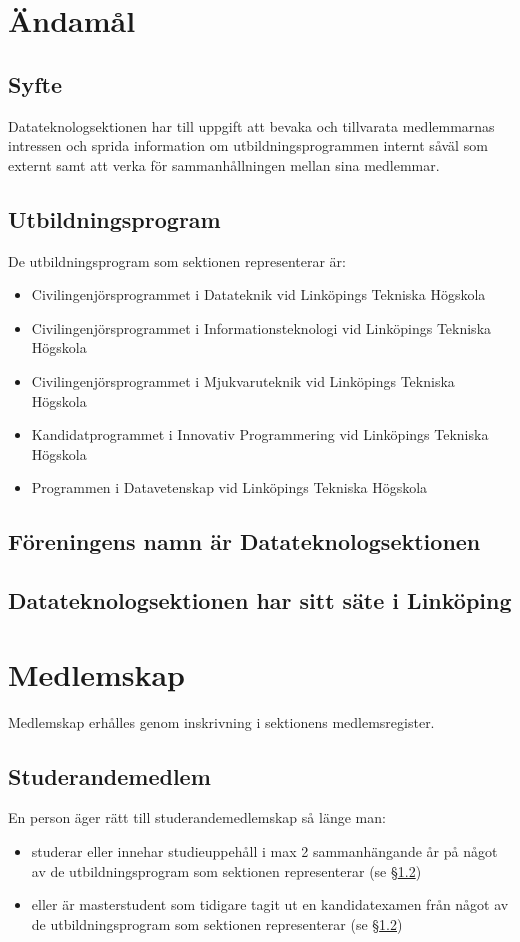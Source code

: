\documentclass{datateknologsektionen-document}
\begin{document}
\section{Ändamål}
\subsection{Syfte}
\label{syfte}
Datateknologsektionen har till uppgift att bevaka och tillvarata medlemmarnas intressen
och sprida information om utbildningsprogrammen internt såväl som externt samt att
verka för sammanhållningen mellan sina medlemmar.
\subsection{Utbildningsprogram}
\label{utbildningsprogram}
De utbildningsprogram som sektionen representerar är:
\begin{itemize}
  \item Civilingenjörsprogrammet i Datateknik vid Linköpings Tekniska Högskola
  \item Civilingenjörsprogrammet i Informationsteknologi vid Linköpings Tekniska Högskola
  \item Civilingenjörsprogrammet i Mjukvaruteknik vid Linköpings Tekniska Högskola
  \item Kandidatprogrammet i Innovativ Programmering vid Linköpings Tekniska Högskola
  \item Programmen i Datavetenskap vid Linköpings Tekniska Högskola
\end{itemize}

\subsection{Föreningens namn är Datateknologsektionen}
\subsection{Datateknologsektionen har sitt säte i Linköping}
\section{Medlemskap}
\label{medlemskap}
Medlemskap erhålles genom inskrivning i sektionens medlemsregister.
\subsection{Studerandemedlem}
En person äger rätt till studerandemedlemskap så länge man:
\begin{itemize}
  \item studerar eller innehar studieuppehåll i max 2 sammanhängande år på något av de
        utbildningsprogram som sektionen representerar (se \S \ref{utbildningsprogram})
  \item eller är masterstudent som tidigare tagit ut en kandidatexamen från något av de
        utbildningsprogram som sektionen representerar (se \S \ref{utbildningsprogram})
\end{itemize}
\end{document}
